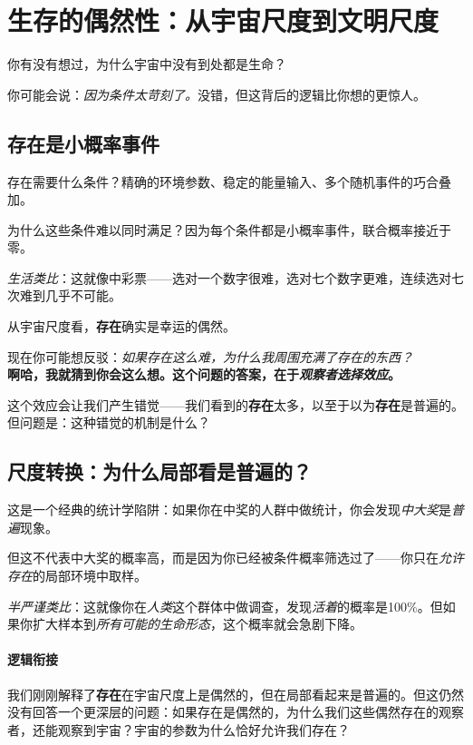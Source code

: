 	\section{生存的偶然性：从宇宙尺度到文明尺度}

	你有没有想过，为什么宇宙中没有到处都是生命？

	你可能会说：\textit{因为条件太苛刻了。}没错，但这背后的逻辑比你想的更惊人。

	\subsection{存在是小概率事件}

	存在需要什么条件？精确的环境参数、稳定的能量输入、多个随机事件的巧合叠加。

	为什么这些条件难以同时满足？因为每个条件都是小概率事件，联合概率接近于零。

	\textit{生活类比}：这就像中彩票——选对一个数字很难，选对七个数字更难，连续选对七次难到几乎不可能。

	从宇宙尺度看，\textbf{存在}确实是幸运的偶然。

	\begin{tcolorbox}[colback=yellow!5, title=\textit{读者行为预测}]
		现在你可能想反驳：\textit{如果存在这么难，为什么我周围充满了存在的东西？}\\
		\textbf{啊哈，我就猜到你会这么想。这个问题的答案，在于\textit{观察者选择效应}。}
	\end{tcolorbox}

	这个效应会让我们产生错觉——我们看到的\textbf{存在}太多，以至于以为\textbf{存在}是普遍的。但问题是：这种错觉的机制是什么？

	\subsection{尺度转换：为什么局部看是普遍的？}

	这是一个经典的统计学陷阱：如果你在中奖的人群中做统计，你会发现\textit{中大奖}是\textit{普遍}现象。

	但这不代表中大奖的概率高，而是因为你已经被条件概率筛选过了——你只在\textit{允许存在}的局部环境中取样。

	\textit{半严谨类比}：这就像你在\textit{人类}这个群体中做调查，发现\textit{活着}的概率是100\%。但如果你扩大样本到\textit{所有可能的生命形态}，这个概率就会急剧下降。

	\paragraph*{逻辑衔接}
	我们刚刚解释了\textbf{存在}在宇宙尺度上是偶然的，但在局部看起来是普遍的。但这仍然没有回答一个更深层的问题：如果存在是偶然的，为什么我们这些偶然存在的观察者，还能观察到宇宙？宇宙的参数为什么恰好允许我们存在？

